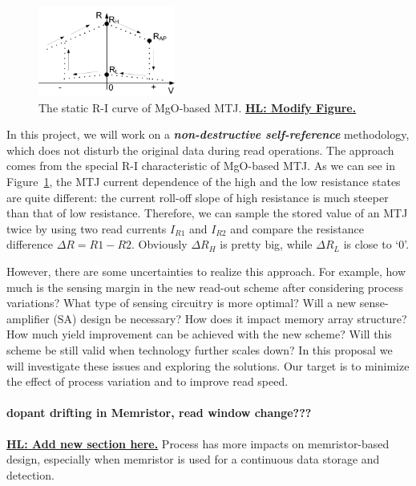\begin{figure}\centering \centering
\vspace{-18pt}
\includegraphics[width=0.4\textwidth]{./figure/RIcurve.pdf}
\caption{The static R-I curve of MgO-based MTJ. \textbf{\underline{HL: Modify Figure.}}}\label{mtj-RI}
\end{figure}

In this project, we will work on a \textbf{\textit{non-destructive self-reference}} methodology, which does not disturb the original data during read operations. The approach comes from the special R-I characteristic of MgO-based MTJ. As we can see in Figure~\ref{mtj-RI}, the MTJ current dependence of the high and the low resistance states are quite different: the current roll-off slope of high resistance is much steeper than that of low resistance. Therefore, we can sample the stored value of an MTJ twice by using two read currents $I_{R1}$ and $I_{R2}$ and compare the resistance difference ${\Delta}R=R1-R2$. Obviously ${\Delta}R_H$ is pretty big, while ${\Delta}R_L$ is close to `0'.

However, there are some uncertainties to realize this approach. For example, how much is the sensing margin in the new read-out scheme after considering process variations? What type of sensing circuitry is more optimal? Will a new sense-amplifier (SA) design be necessary? How does it impact memory array structure? How much yield improvement can be achieved with the new scheme? Will this scheme be still valid when technology further scales down? In this proposal we will investigate these issues and exploring the solutions. Our target is to minimize the effect of process variation and to improve read speed.

\paragraph{dopant drifting in Memristor, read window change???}
\textbf{\underline{HL: Add new section here.}}
Process has more impacts on memristor-based design, especially when memristor is used for a continuous data storage and detection.



